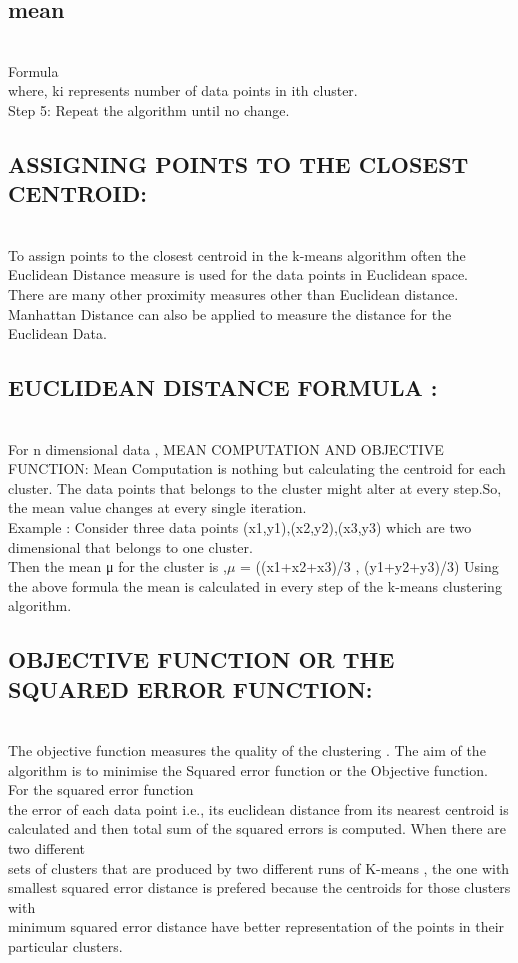 \documentclass[11pt]{article}
\begin{document}
\subsection{mean}\\

Formula\\

where, ki represents number of data points in ith cluster.\\

Step 5: Repeat the algorithm until no change.\\

\subsection{ASSIGNING POINTS TO THE CLOSEST CENTROID:}\\
To assign points to the closest centroid in the k-means algorithm often the Euclidean Distance measure is used for the data points in Euclidean space.\\
There are many other proximity measures other than Euclidean distance. Manhattan Distance can also be applied to measure the distance for the Euclidean Data. 
\subsection{EUCLIDEAN DISTANCE FORMULA :}\\

 For n dimensional data ,
MEAN COMPUTATION AND OBJECTIVE FUNCTION:
Mean Computation is nothing but calculating the centroid for each cluster. The data points that belongs to the cluster might alter at every step.So, the mean value changes at every single iteration.\\
Example : Consider three data points (x1,y1),(x2,y2),(x3,y3) which are two dimensional that belongs to one cluster.\\
Then the mean μ for the cluster is ,$\mu$ = ((x1+x2+x3)/3 , (y1+y2+y3)/3)
Using the above formula the mean is calculated in every step of the k-means clustering algorithm.


\subsection{OBJECTIVE FUNCTION OR THE SQUARED ERROR FUNCTION:}\\

The objective function measures the quality of the clustering . The aim of the algorithm is to minimise the Squared error function or the Objective function. For the squared error function\\
the error of each data point i.e., its euclidean distance from its nearest centroid is calculated and then total sum of the squared errors is computed. When there are two different\\
sets of clusters that are produced by two different runs of K-means , the one with smallest squared error distance is prefered because the centroids for those clusters with\\
minimum squared error distance have better representation of the points in their particular clusters.
\end{document}
